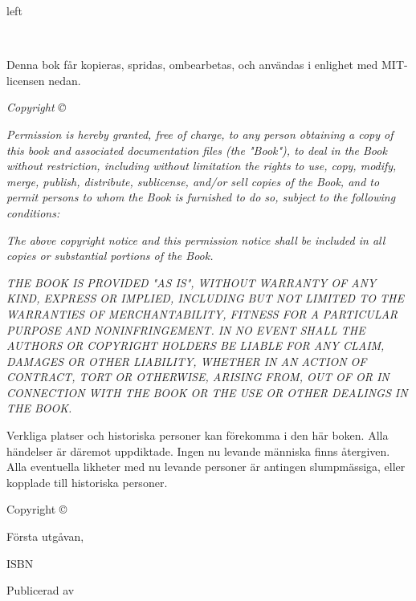 
\begin{narrowsection}{155mm}{left}
{\small
\setlength{\parindent}{0em}\setlength{\parskip}{1em}

~

\vfill

Denna bok får kopieras, spridas, ombearbetas, och användas i enlighet med MIT-licensen nedan.

\textit{Copyright \copyright{} \copyrightyear{} \authorname}

\textit{Permission is hereby granted, free of charge, to any person obtaining a copy of this book and associated documentation files (the "Book"), to deal in the Book without restriction, including without limitation the rights to use, copy, modify, merge, publish, distribute, sublicense, and/or sell copies of the Book, and to permit persons to whom the Book is furnished to do so, subject to the following conditions:}

\textit{The above copyright notice and this permission notice shall be included in all copies or substantial portions of the Book.}

\textit{THE BOOK IS PROVIDED "AS IS", WITHOUT WARRANTY OF ANY KIND, EXPRESS OR IMPLIED, INCLUDING BUT NOT LIMITED TO THE WARRANTIES OF MERCHANTABILITY, FITNESS FOR A PARTICULAR PURPOSE AND NONINFRINGEMENT. IN NO EVENT SHALL THE AUTHORS OR COPYRIGHT HOLDERS BE LIABLE FOR ANY CLAIM, DAMAGES OR OTHER LIABILITY, WHETHER IN AN ACTION OF CONTRACT, TORT OR OTHERWISE, ARISING FROM, OUT OF OR IN CONNECTION WITH THE BOOK OR THE USE OR OTHER DEALINGS IN THE BOOK.}

Verkliga platser och historiska personer kan förekomma i den här boken. Alla händelser är däremot uppdiktade. Ingen nu levande människa finns återgiven. Alla eventuella likheter med nu levande personer är antingen slumpmässiga, eller kopplade till historiska personer.

Copyright \copyright{} \copyrightyear{} \authorname

Första utgåvan, \editionyear{}

ISBN \isbn{}

Publicerad av \publisher{}
}
\end{narrowsection}
